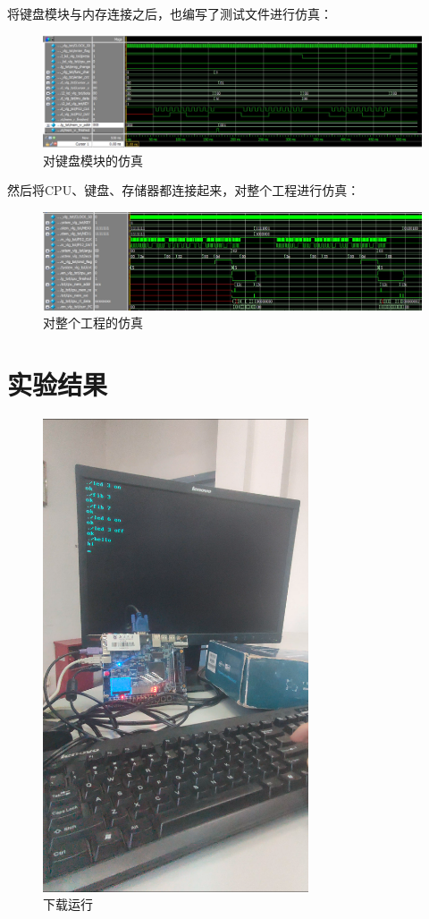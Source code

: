 \documentclass[12pt,a4paper,UTF8]{article}
\begin{document}
将键盘模块与内存连接之后，也编写了测试文件进行仿真：
\begin{figure}[H]
  \centering
  \includegraphics[width=1\textwidth]{sim_kd.JPG}
  \caption{对键盘模块的仿真}
  \label{sim_kd}
\end{figure}

然后将CPU、键盘、存储器都连接起来，对整个工程进行仿真：
\begin{figure}[H]
  \centering
  \includegraphics[width=1\textwidth]{sim_all.JPG}
  \caption{对整个工程的仿真}
  \label{sim_all}
\end{figure}


\section{实验结果}
\begin{figure}[H]
  \centering
  \includegraphics[width=0.7\textwidth]{fpga.PNG}
  \caption{下载运行}
  \label{fpga}
\end{figure}
\end{document}
